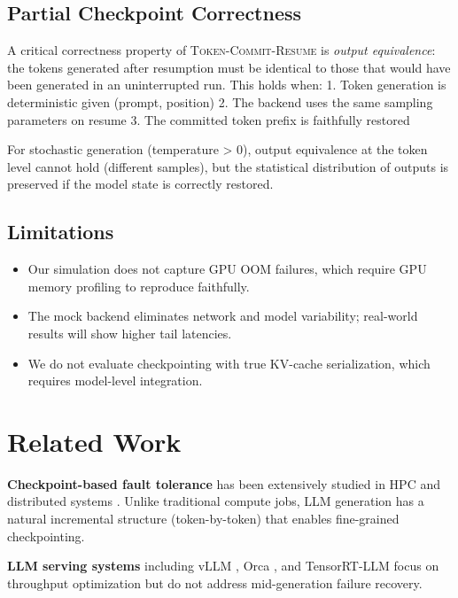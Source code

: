 \documentclass[10pt,twocolumn]{article}
\newcommand{\tcr}{\textsc{Token-Commit-Resume}}
\begin{document}
\subsection{Partial Checkpoint Correctness}

A critical correctness property of \tcr{} is \textit{output equivalence}:
the tokens generated after resumption must be identical to those that would
have been generated in an uninterrupted run. This holds when:
1. Token generation is deterministic given (prompt, position)
2. The backend uses the same sampling parameters on resume
3. The committed token prefix is faithfully restored

For stochastic generation (temperature > 0), output equivalence at the
token level cannot hold (different samples), but the statistical distribution
of outputs is preserved if the model state is correctly restored.

\subsection{Limitations}

\begin{itemize}[leftmargin=*,itemsep=2pt]
  \item Our simulation does not capture GPU OOM failures, which require
    GPU memory profiling to reproduce faithfully.
  \item The mock backend eliminates network and model variability; real-world
    results will show higher tail latencies.
  \item We do not evaluate checkpointing with true KV-cache serialization,
    which requires model-level integration.
\end{itemize}

\section{Related Work}
\label{sec:related}

\textbf{Checkpoint-based fault tolerance} has been extensively studied in
HPC and distributed systems \cite{elnozahy2002survey, chandy1985distributed}.
Unlike traditional compute jobs, LLM generation has a natural incremental
structure (token-by-token) that enables fine-grained checkpointing.

\textbf{LLM serving systems} including vLLM \cite{kwon2023vllm}, Orca
\cite{yu2022orca}, and TensorRT-LLM \cite{tensorrtllm2023} focus on
throughput optimization but do not address mid-generation failure recovery.
\end{document}
